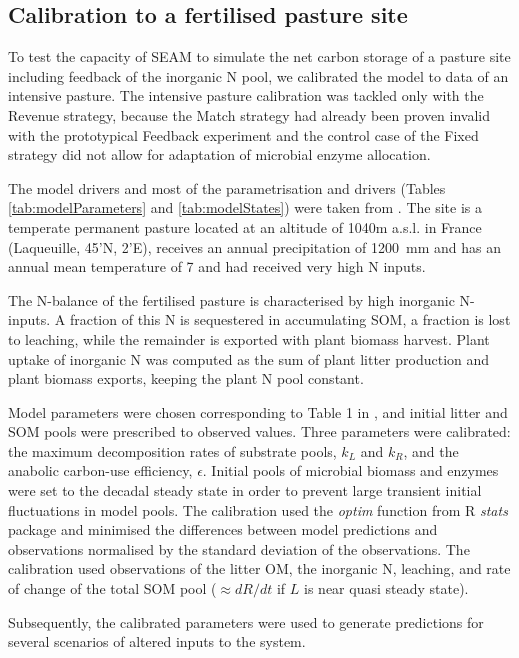 \subsection{Calibration to a fertilised pasture site}
\label{sec:methodsPasture}

To test the capacity of SEAM to simulate the net carbon storage of a
pasture site including feedback of the inorganic N pool, we calibrated the
model to data of an intensive pasture. The intensive
pasture calibration was tackled only with the Revenue strategy, because the
Match strategy had already been proven invalid with the prototypical Feedback
experiment and the control case of the Fixed strategy did not allow for adaptation
of microbial enzyme allocation.

The model drivers and most of the parametrisation and drivers (Tables
\ref{tab:modelParameters} and \ref{tab:modelStates}) were taken from
\citet{Perveen14}.
The site is a temperate permanent pasture located at an altitude of 1040m
a.s.l. in France (Laqueuille, 45'N, 2'E), receives
an annual precipitation of 1200~mm and has an annual mean temperature of  7
 and had received very high N inputs.

The N-balance of the fertilised pasture is characterised by high inorganic
N-inputs. A fraction of this N is sequestered in accumulating SOM, a fraction is
lost to leaching, while the remainder is exported with plant biomass harvest.
Plant uptake of inorganic N was computed as the sum of plant litter production
and plant biomass exports, keeping the plant N pool constant.
 
Model parameters were chosen corresponding to Table 1 in \citet{Perveen14}, and
initial litter and SOM pools were prescribed to observed values.
Three parameters were calibrated: the maximum decomposition rates
of substrate pools, $k_L$ and $k_R$, and the anabolic carbon-use efficiency,
$\epsilon$. Initial pools of microbial biomass and enzymes were set to the
decadal steady state in order to prevent large transient initial
fluctuations in model pools. The calibration used the \textit{optim} function
from R \textit{stats} package \citep{R07} and minimised the differences between model
predictions and observations normalised by the standard deviation of the
observations. The calibration used observations of the litter OM, the inorganic
N, leaching, and rate of change of the total SOM pool ($\approx dR/dt$ if $L$ is
near quasi steady state). 

Subsequently, the calibrated parameters were used to generate
predictions for several scenarios of altered inputs to the system.


